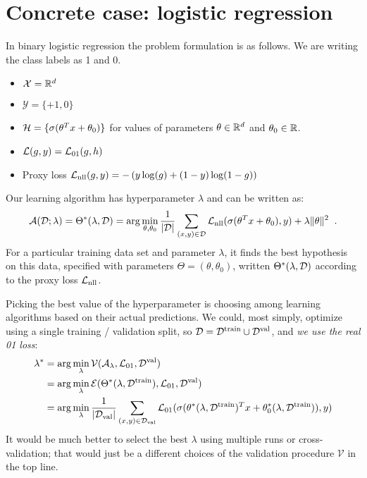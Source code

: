 \section{Concrete case: logistic regression}
In binary logistic regression the problem formulation is as follows.
We are writing the class labels as 1 and 0.
\begin{itemize}
  \item $\mathcal{X} = \mathbb{R}^d$
  \item $\mathcal{Y} = \{+1, 0\}$
  \item ${\cal H} = \{\sigma(\theta^T x + \theta_0)\}$ for values of
        parameters $\theta \in \mathbb{R}^d$ and $\theta_0 \in \mathbb{R}$.
  \item $\mathcal{L}(g, y) = \mathcal{L}_{01}(g, h)$
  \item Proxy loss $\mathcal{L}_\text{nll}(g, y) = -\left(y \log (g) + (1 - y)\log (1 -g)\right)$
\end{itemize}

Our learning algorithm has hyperparameter $\lambda$ and can be written
as:
\[\mathcal{A}({\cal D}; \lambda) = \Theta^*(\lambda, {\cal D}) = {\rm arg}\min_{\theta, \theta_0}
  \frac{1}{|{\cal D}|} \sum_{(x, y) \in {\cal D}} \mathcal{L}_\text{nll}(\sigma(\theta^Tx +
  \theta_0), y) + \lambda\|\theta\|^2 \;\;.\]
For a particular training data set and parameter $\lambda$, it finds
the best hypothesis on this data, specified with parameters $\Theta =
  (\theta, \theta_0)$, written  $\Theta^*(\lambda, {\cal D})$ according to
the proxy loss $\mathcal{L}_\text{nll}$.

Picking the best value of the hyperparameter is choosing among
learning algorithms based on their actual predictions. We could, most simply,
optimize using a single training / validation split, so ${\cal D} =
  {\cal D}^\text{train} \cup {\cal D}^\text{val}$, and {\em we use the real
    01 loss}:
\begin{align*}
  \lambda^* & = {\rm arg}\min_{\lambda} \mathcal{V}(\mathcal{A}_\lambda, \mathcal{L}_{01},
  {\cal D}^\text{val})                                                                             \\
            & = {\rm arg}\min_{\lambda} \mathcal{E}(\Theta^*(\lambda, {\cal D}^\text{train}), \mathcal{L}_{01},
  {\cal D}^\text{val})                                                                             \\
            & = {\rm arg}\min_{\lambda} \frac{1}{|{\cal D}_\text{val}|} \sum_{(x, y) \in
    {\cal D}_\text{val}} \mathcal{L}_{01}(\sigma(\theta^*(\lambda, {\cal D}^\text{train})^T x +
  \theta^*_0(\lambda, {\cal D}^\text{train})), y)
\end{align*}
It would be much better to select the best $\lambda$ using multiple
runs or cross-validation;  that would just be a different choices of
the validation procedure $\mathcal{V}$ in the top line.

